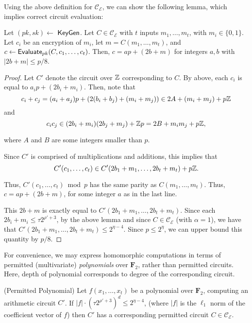 Using the above definition for $\mathcal{C}_\mathcal{E}$, we can show the following lemma, which implies correct circuit evaluation:
\begin{lemma} \label{lem:ciphertextbound}
Let $(pk, sk) \leftarrow$ ${\sf KeyGen}$. Let $C \in \mathcal{C}_\mathcal{E}$ with $t$ inputs $m_1, \dots, m_t$, with $m_i \in \{0, 1\}$. Let $c_i$ be an encryption of $m_i$, let $m = C(m_1, \dots, m_t)$, and $c \leftarrow {\sf Evaluate}_{pk}(C, c_1, \dots, c_t)$. Then, $c = ap + (2b + m)$ for integers $a, b$ with $|2b + m| \leq p/8$.
\end{lemma}
\begin{proof}
Let $C'$ denote the circuit over $\mathbb{Z}$ corresponding to $C$. By above, each $c_i$ is equal to $a_ip + (2b_i + m_i)$. Then, note that
\[c_i + c_j = (a_i + a_j)p + (2(b_i + b_j) + (m_i + m_j)) \in 2A + (m_i + m_j) + p\mathbb{Z}\]
and
\[c_ic_j \in (2b_i + m_i)(2b_j + m_j) + \mathbb{Z} p = 2B + m_i m_j + p\mathbb{Z},\]

where $A$ and $B$ are some integers smaller than $p$.

Since $C'$ is comprised of multiplications and additions, this implies that
\[C'(c_1, \dots, c_t) \in C'(2b_1 + m_1, \dots, 2b_t + m_t) + p\mathbb{Z}.\]

Thus, $C'(c_1, \dots, c_t) \bmod p$ has the same parity as $C(m_1, \dots, m_t)$. Thus, $c = ap + (2b + m)$, for some integer $a$ as in the last line.

This $2b + m$ is exactly equal to $C'(2b_1 + m_1, \dots, 2b_t + m_t)$. Since each $2b_i + m_i \leq \tau 2^{\rho' + 3}$, by the above lemma and since $C \in \mathcal{C}_\mathcal{E}$ (with $\alpha = 1$), we have that $C'(2b_1 + m_1, \dots, 2b_t + m_t) \leq 2^{\eta - 4}.$ Since $p \leq 2^\eta$, we can upper bound this quantity by $p / 8$.
\end{proof}


For convenience, we may express homomorphic computations in terms of permitted (multivariate) \emph{polynomials} over $\mathbf{F}_2$, rather than permitted circuits. Here, depth of polynomial corresponds to degree of the corresponding circuit.

\begin{lemma} (Permitted Polynomial) \label{lem: permpoly}
Let $f(x_1, \dots, x_t)$ be a polynomial over $\mathbf{F}_2$, computing an arithmetic circuit $C'$. If $|f| \cdot (\tau 2^{\rho' + 3})^d \leq 2^{\eta - 4}$, (where $|f|$ is the $\ell_1$ norm of the coefficient vector of $f$) then $C'$ has a corresponding permitted circuit $C \in \mathcal{C}_\mathcal{E}$.
\end{lemma} %


